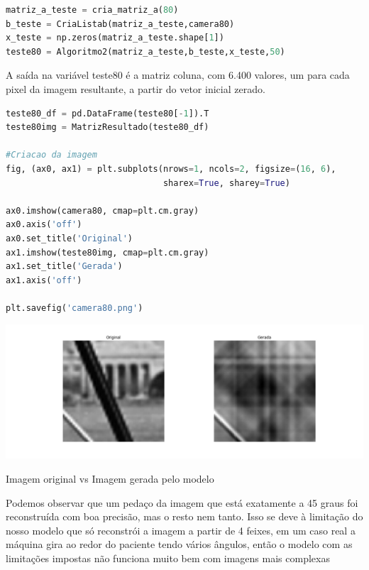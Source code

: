 \documentclass[a4paper, 12pt]{article}
\begin{document}
\begin{lstlisting}[language=Python, caption=Teste 1 imagem 80 x 80, label=teste1_80]
matriz_a_teste = cria_matriz_a(80)
b_teste = CriaListab(matriz_a_teste,camera80)
x_teste = np.zeros(matriz_a_teste.shape[1])
teste80 = Algoritmo2(matriz_a_teste,b_teste,x_teste,50)
\end{lstlisting}

A saída na variável teste80 é a matriz coluna, com 6.400 valores, um para cada pixel da imagem resultante, a partir do vetor inicial zerado.


\begin{lstlisting}[language=Python, caption=Teste 1 imagem 80 x 80, label=teste1_80]
teste80_df = pd.DataFrame(teste80[-1]).T
teste80img = MatrizResultado(teste80_df)

#Criacao da imagem
fig, (ax0, ax1) = plt.subplots(nrows=1, ncols=2, figsize=(16, 6),
                               sharex=True, sharey=True)

ax0.imshow(camera80, cmap=plt.cm.gray)
ax0.axis('off')
ax0.set_title('Original')
ax1.imshow(teste80img, cmap=plt.cm.gray)
ax1.set_title('Gerada')
ax1.axis('off')

plt.savefig('camera80.png')
\end{lstlisting}

\begin{center}

\includegraphics[width=16cm]{13_camera80.png}

Imagem original vs Imagem gerada pelo modelo   
    
\end{center}

Podemos observar que um pedaço da imagem que está exatamente a 45 graus foi reconstruída com boa precisão, mas o resto nem tanto. Isso se deve à limitação do nosso modelo que só reconstrói a imagem a partir de 4 feixes, em um caso real a máquina gira ao redor do paciente tendo vários ângulos, então o modelo com as limitações impostas não funciona muito bem com imagens mais complexas
\end{document}
